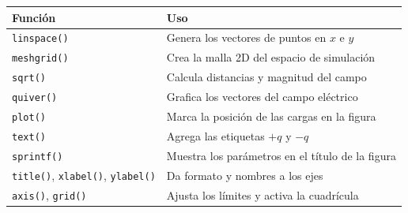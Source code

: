 
\begin{center}
\begin{tabular}{|l|l|}
\hline
\textbf{Función} & \textbf{Uso} \\ \hline
\verb|linspace()| & Genera los vectores de puntos en $x$ e $y$ \\ \hline 
\verb|meshgrid()| & Crea la malla 2D del espacio de simulación \\ \hline
\verb|sqrt()| & Calcula distancias y magnitud del campo \\ \hline
\verb|quiver()| & Grafica los vectores del campo eléctrico \\ \hline
\verb|plot()| & Marca la posición de las cargas en la figura \\ \hline
\verb|text()| & Agrega las etiquetas $+q$ y $-q$ \\ \hline
\verb|sprintf()| & Muestra los parámetros en el título de la figura \\ \hline
\verb|title()|, \verb|xlabel()|, \verb|ylabel()| & Da formato y nombres a los ejes \\ \hline
\verb|axis()|, \verb|grid()| & Ajusta los límites y activa la cuadrícula \\ \hline
\end{tabular}
\end{center}
